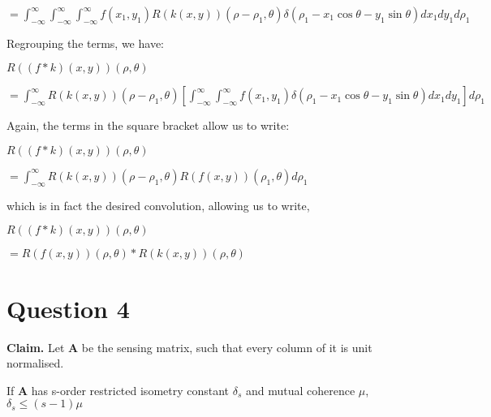 \documentclass[fleqn, 11pt]{article}
\newcommand{\bs}[1]{\boldsymbol{#1}}
\begin{document}
\smallskip

$
=   \displaystyle \int_{-\infty }^{\infty} \int_{-\infty }^{\infty} \int_{-\infty }^{\infty} f(x_1,y_1)  
R(k(x,y))(\rho - \rho_1, \theta) \delta ( \rho_1 - x_1 \cos \theta - y_1 \sin \theta  )
dx_1 dy_1 d \rho_1   $


\bigskip


Regrouping the terms, we have: 


\medskip 

$R((f * k) (x,y)) (\rho, \theta) 
$


\smallskip

$
=   \displaystyle \int_{-\infty }^{\infty} R(k(x,y))(\rho - \rho_1, \theta) \left[ \int_{-\infty }^{\infty} \int_{-\infty }^{\infty} f(x_1,y_1)  
 \delta ( \rho_1 - x_1 \cos \theta - y_1 \sin \theta  )
dx_1 dy_1 \right] d \rho_1   $


\bigskip

Again, the terms in the square bracket allow us to write: 


\medskip 

$R((f * k) (x,y)) (\rho, \theta) 
$


\smallskip

$
=   \displaystyle \int_{-\infty }^{\infty} R(k(x,y))(\rho - \rho_1, \theta) 
R(f(x,y)) (\rho_1, \theta ) 
d \rho_1   $


\bigskip

which is in fact the desired convolution, allowing us to write,


\medskip 

$R((f * k) (x,y)) (\rho, \theta) 
$


\smallskip

$
= R(f(x,y))  (\rho, \theta)  * R(k(x,y))  (\rho, \theta) 
$


\bigskip



\newpage
\section*{Question 4}
\setcounter{equation}{0}

\textbf{Claim. } Let $\bs{A}$ be the sensing matrix, 
such that every column of it is unit normalised.

If $\bs{A}$ has s-order restricted isometry constant $\delta_s$ 
and mutual coherence $\mu$, 
$\delta_s \leq (s-1) \mu $ 


\hrulefill 

\medskip
\end{document}
